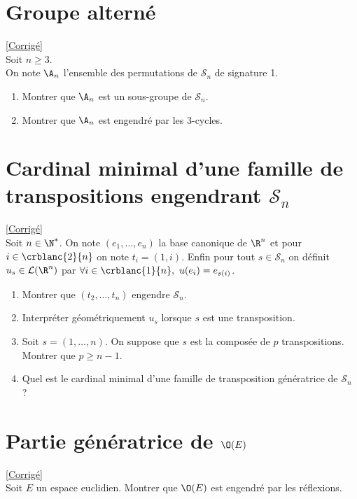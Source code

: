 \documentclass[8pt]{book}
\begin{document}
	\section{Groupe alterné }
	\label{Groupe alterné}
	\textcolor{blue}{\hyperref[Groupe alterné corrigé]{[Corrigé]}}\\
	Soit $n\geq 3$.\\
	On note $\A_n$ l'ensemble des permutations de $\mathcal S_n$ de signature 1.
	\begin{enumerate}
		\item Montrer que $\A_n$ est un sous-groupe de $\mathcal S_n$.
		\item Montrer que $\A_n$ est engendré par les $3$-cycles.
	\end{enumerate}
	
	\section{Cardinal minimal d'une famille de transpositions engendrant $\mathcal S_n$ }
	\label{Cardinal minimal d'une famille de transpostions engendrant Sn}
	\textcolor{blue}{\hyperref[Cardinal minimal d'une famille de transpositions engendrant Sn corrigé]{[Corrigé]}}\\
	Soit $n\in \N^*$. On note $(e_1,\dots,e_n)$ la base canonique de $\R^n$ et pour $i\in \crblanc{2}{n}$ on note $t_i=(1,i)$. Enfin pour tout $s\in \mathcal S_n$ on définit $u_s\in \mathcal L(\R^n)$ par $\forall i\in \crblanc{1}{n},\ u(e_i)=e_{s(i)}$.
	\begin{enumerate}
		\item Montrer que $(t_2,\dots,t_n)$ engendre $\mathcal S_n$.
		\item Interpréter géométriquement $u_s$ lorsque $s$ est une transposition.
		\item Soit $s=(1,\dots,n)$. On suppose que $s$ est la composée de $p$ transpositions. Montrer que $p\geq n-1$.
		\item Quel est le cardinal minimal d'une famille de transposition génératrice de $\mathcal S_n$ ?
	\end{enumerate}
	
	\section{Partie génératrice de $\O(E)$ }
	\label{Partie génératrice de O(E)}
	\textcolor{blue}{\hyperref[Partie génératrice de O(E) corrigé]{[Corrigé]}}\\
	Soit $E$ un espace euclidien. Montrer que $\O(E)$ est engendré par les réflexions.
	
\end{document}
